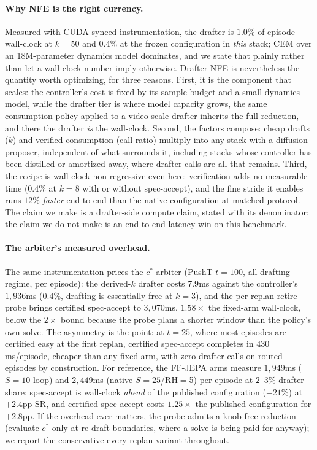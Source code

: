 \documentclass{article}
\begin{document}
\paragraph{Why NFE is the right currency.} Measured with CUDA-synced
instrumentation, the drafter is $1.0\%$ of episode wall-clock at $k{=}50$ and $0.4\%$
at the frozen configuration in \emph{this} stack; CEM over an 18M-parameter
dynamics model dominates, and we state that plainly rather than let a wall-clock
number imply otherwise. Drafter NFE is nevertheless the quantity worth optimizing,
for three reasons. First, it is the component that scales: the controller's cost is
fixed by its sample budget and a small dynamics model, while the drafter tier is
where model capacity grows, the same consumption policy applied to a video-scale
drafter inherits the full reduction, and there the drafter \emph{is} the wall-clock.
Second, the factors compose: cheap drafts ($k$) and verified consumption (call ratio)
multiply into any stack with a diffusion proposer, independent of what surrounds it, including stacks whose controller has been distilled or amortized away, where
drafter calls are all that remains. Third, the recipe is wall-clock non-regressive
even here: verification adds no measurable time ($0.4\%$ at $k{=}8$ with or without
spec-accept), and the fine stride it enables runs $12\%$ \emph{faster} end-to-end
than the native configuration at matched protocol. The claim we make is a
drafter-side compute claim, stated with its denominator; the claim we do not make is
an end-to-end latency win on this benchmark.

\paragraph{The arbiter's measured overhead.} The same instrumentation prices the
$c^{*}$ arbiter (PushT $t{=}100$, all-drafting regime, per episode): the derived-$k$
drafter costs $7.9$ms against the controller's $1{,}936$ms ($0.4\%$, drafting is
essentially free at $k{=}3$), and the per-replan retire probe brings certified
spec-accept to $3{,}070$ms, $1.58\times$ the fixed-arm wall-clock, below the $2\times$
bound because the probe plans a shorter window than the policy's own solve. The
asymmetry is the point: at $t{=}25$, where most episodes are certified easy at the
first replan, certified spec-accept completes in $430$ms/episode, cheaper than any
fixed arm, with zero drafter calls on routed episodes by construction. For
reference, the FF-JEPA arms measure $1{,}949$ms ($S{=}10$ loop) and $2{,}449$ms
(native $S{=}25$/RH$=$5) per episode at $2$--$3\%$ drafter share: spec-accept is
wall-clock \emph{ahead} of the published configuration ($-21\%$) at $+2.4$pp SR, and
certified spec-accept costs $1.25\times$ the published configuration for $+2.8$pp. If
the overhead ever matters, the probe admits a knob-free reduction (evaluate $c^{*}$
only at re-draft boundaries, where a solve is being paid for anyway); we report the
conservative every-replan variant throughout.
\end{document}
